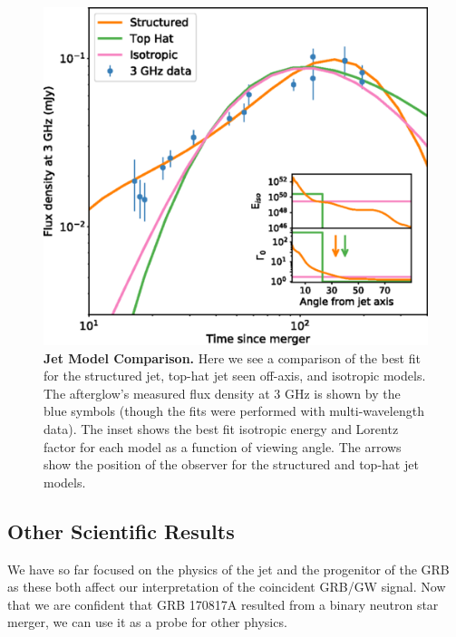 \documentclass[11pt]{cuthesis}
\begin{document}
\begin{figure} %
\begin{center}
\includegraphics[width=1.0\linewidth]{grb_model_comparison.png}
\end{center}
\caption{\textbf{Jet Model Comparison.} Here we see a comparison of the best fit for the structured jet, top-hat jet seen off-axis, and isotropic models. The afterglow's measured flux density at 3 GHz is shown by the blue symbols (though the fits were performed with multi-wavelength data). The inset shows the best fit isotropic energy and Lorentz factor for each model as a function of viewing angle. The arrows show the position of the observer for the structured and top-hat jet models.\cite{Lazzati_afterglow} }
\label{fig:model comparison}
\end{figure}

\subsection{Other Scientific Results}
We have so far focused on the physics of the jet and the progenitor of the GRB as these both affect our interpretation of the coincident GRB/GW signal. Now that we are confident that GRB 170817A resulted from a binary neutron star merger, we can use it as a probe for other physics. 
\end{document}
